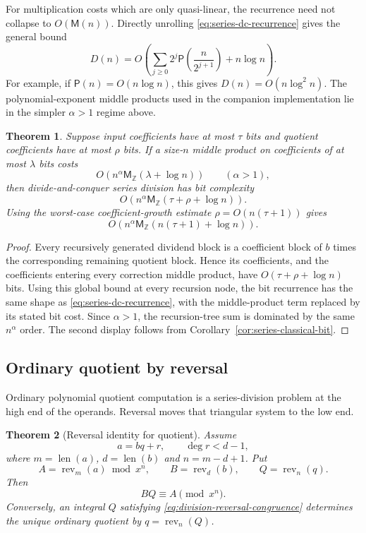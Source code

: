 \documentclass[11pt]{book}
\newtheorem{theorem}{Theorem}[section]
\theoremstyle{definition}
\newcommand{\ZZ}{\mathbb Z}
\newcommand{\len}{\operatorname{len}}
\newcommand{\MZ}{\mathsf M_{\ZZ}}
\begin{document}
For multiplication costs which are only quasi-linear, the recurrence need not
collapse to $O(\mathsf M(n))$.  Directly unrolling
\eqref{eq:series-dc-recurrence} gives the general bound
\[
 D(n)=O\!\left(
  \sum_{j\geq0}2^j\mathsf P\!\left(\frac{n}{2^{j+1}}\right)
  +n\log n
 \right).
\]
For example, if $\mathsf P(n)=O(n\log n)$, this gives
$D(n)=O(n\log^2 n)$.  The polynomial-exponent middle products used in the
companion implementation lie in the simpler $\alpha>1$ regime above.

\begin{theorem}\label{thm:series-quo-dc-bit}
Suppose input coefficients have at most $\tau$ bits and quotient coefficients
have at most $\rho$ bits.  If a size-$n$ middle product on coefficients of at
most $\lambda$ bits costs
\[
 O\!\left(n^\alpha\MZ(\lambda+\log n)\right)
 \qquad (\alpha>1),
\]
then divide-and-conquer series division has bit complexity
\[
 O\!\left(
 n^\alpha\MZ(\tau+\rho+\log n)
 \right).
\]
Using the worst-case coefficient-growth estimate
$\rho=O(n(\tau+1))$ gives
\[
 O\!\left(
 n^\alpha\MZ(n(\tau+1)+\log n)
 \right).
\]
\end{theorem}

\begin{proof}
Every recursively generated dividend block is a coefficient block of $b$ times
the corresponding remaining quotient block.  Hence its coefficients, and the
coefficients entering every correction middle product, have
$O(\tau+\rho+\log n)$ bits.  Using this global bound at every recursion node,
the bit recurrence has the same shape as
\eqref{eq:series-dc-recurrence}, with the middle-product term replaced by its
stated bit cost.  Since $\alpha>1$, the recursion-tree sum is dominated by the
same $n^\alpha$ order.  The second display follows from
Corollary~\ref{cor:series-classical-bit}.
\end{proof}

\subsection{Ordinary quotient by reversal}

Ordinary polynomial quotient computation is a series-division problem at the
high end of the operands.  Reversal moves that triangular system to the low
end.

\begin{theorem}[Reversal identity for quotient]\label{thm:division-reversal}
Assume
\[
 a=bq+r,
 \qquad
 \deg r<d-1,
\]
where $m=\len(a)$, $d=\len(b)$ and $n=m-d+1$.  Put
\[
 A=\operatorname{rev}_m(a)\bmod x^n,
 \qquad
 B=\operatorname{rev}_d(b),
 \qquad
 Q=\operatorname{rev}_n(q).
\]
Then
\begin{equation}\label{eq:division-reversal-congruence}
 BQ\equiv A\pmod{x^n}.
\end{equation}
Conversely, an integral $Q$ satisfying
\eqref{eq:division-reversal-congruence} determines the unique ordinary
quotient by $q=\operatorname{rev}_n(Q)$.
\end{theorem}
\end{document}
